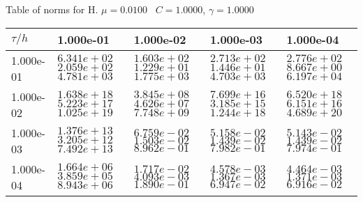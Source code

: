 \begin{center}
Table of norms for H. $\mu = 0.0100$ \, $C = 1.0000$, $\gamma = 1.0000$
  
\begin{tabular}{|p{1in}|p{1in}|p{1in}|p{1in}|p{1in}|} \hline
$\tau / h$ &1.000e-01 &1.000e-02 &1.000e-03 &1.000e-04 \\ \hline 
1.000e-01 & $6.341e+02$  $2.059e+02$  $4.781e+03$  & $1.603e+02$  $1.229e+01$  $1.775e+03$  & $2.713e+02$  $1.446e+01$  $4.703e+03$  & $2.776e+02$  $8.667e+00$  $6.197e+04$  \\ \hline 
1.000e-02 & $1.638e+18$  $5.223e+17$  $1.025e+19$  & $3.845e+08$  $4.626e+07$  $7.748e+09$  & $7.699e+16$  $3.185e+15$  $1.244e+18$  & $6.520e+18$  $6.151e+16$  $4.689e+20$  \\ \hline 
1.000e-03 & $1.376e+13$  $3.205e+12$  $7.492e+13$  & $6.759e-02$  $1.503e-02$  $8.962e-01$  & $5.158e-02$  $1.439e-02$  $7.982e-01$  & $5.143e-02$  $1.439e-02$  $7.974e-01$  \\ \hline 
1.000e-04 & $1.664e+06$  $3.859e+05$  $8.943e+06$  & $1.717e-02$  $4.093e-03$  $1.890e-01$  & $4.578e-03$  $1.367e-03$  $6.947e-02$  & $4.464e-03$  $1.371e-03$  $6.916e-02$  \\ \hline 

\end{tabular}\\[20pt]
\end{center}
